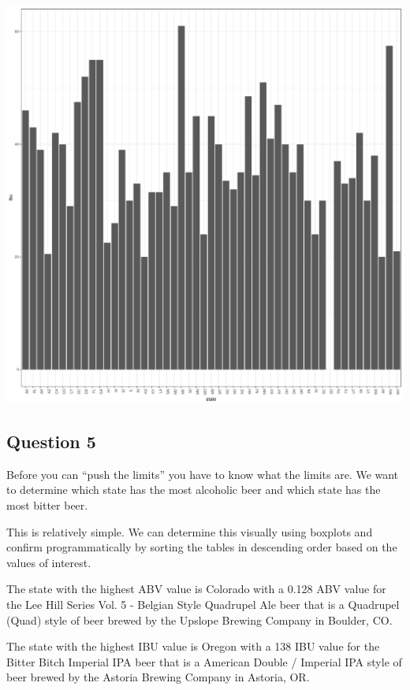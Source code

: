 \documentclass[]{article}
\begin{document}
\begin{center}\includegraphics{Analysis_Final_files/figure-latex/unnamed-chunk-18-2} \end{center}

\subsection{Question 5}\label{question-5}

Before you can ``push the limits'' you have to know what the limits are.
We want to determine which state has the most alcoholic beer and which
state has the most bitter beer.

This is relatively simple. We can determine this visually using boxplots
and confirm programmatically by sorting the tables in descending order
based on the values of interest.

The state with the highest ABV value is Colorado with a 0.128 ABV value
for the Lee Hill Series Vol. 5 - Belgian Style Quadrupel Ale beer that
is a Quadrupel (Quad) style of beer brewed by the Upslope Brewing
Company in Boulder, CO.

The state with the highest IBU value is Oregon with a 138 IBU value for
the Bitter Bitch Imperial IPA beer that is a American Double / Imperial
IPA style of beer brewed by the Astoria Brewing Company in Astoria, OR.
\end{document}
